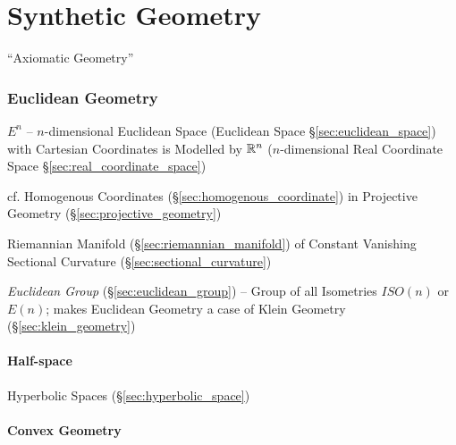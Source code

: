 \part{Synthetic Geometry}\label{part:synthetic_geometry}

``Axiomatic Geometry''



\section{Euclidean Geometry}\label{sec:euclidean_geometry}

$E^n$ -- $n$-dimensional Euclidean Space (Euclidean Space
\S\ref{sec:euclidean_space}) with Cartesian Coordinates is Modelled by
$\mathbb{R}^n$ ($n$-dimensional Real Coordinate Space
\S\ref{sec:real_coordinate_space})

\fist cf. Homogenous Coordinates (\S\ref{sec:homogenous_coordinate})
in Projective Geometry (\S\ref{sec:projective_geometry})

Riemannian Manifold (\S\ref{sec:riemannian_manifold}) of Constant Vanishing
Sectional Curvature (\S\ref{sec:sectional_curvature})

\emph{Euclidean Group} (\S\ref{sec:euclidean_group}) -- Group of all
Isometries $ISO(n)$ or $E(n)$; makes Euclidean Geometry a case of
Klein Geometry (\S\ref{sec:klein_geometry})



\subsection{Half-space}\label{sec:half_space}

Hyperbolic Spaces (\S\ref{sec:hyperbolic_space})



\subsection{Convex Geometry}\label{sec:convex_geometry}


